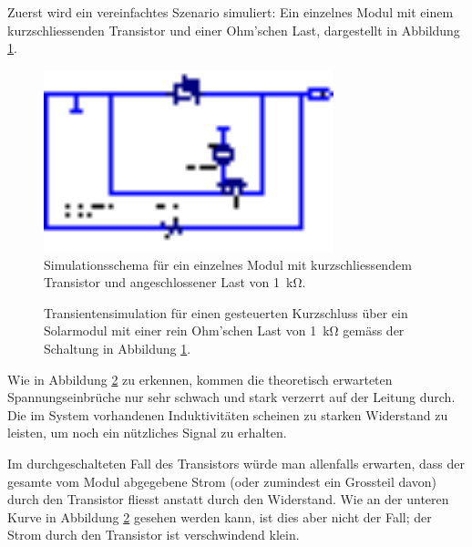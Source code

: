 Zuerst wird ein vereinfachtes Szenario simuliert: Ein einzelnes Modul mit einem
kurzschliessenden Transistor und einer Ohm'schen Last, dargestellt in Abbildung
\ref{fig:ltspice:shortCircuit:simple}.

\begin{figure}[h!tb]
    \centering
    \includegraphics[width=0.75\textwidth]{images/ltspice/jac/shortcircuit-single.eps}
    \caption{
        Simulationsschema  f\"ur  ein  einzelnes Modul  mit  kurzschliessendem
        Transistor und angeschlossener Last von \SI{1}{\kilo\ohm}.%
    }
    \label{fig:ltspice:shortCircuit:simple}
\end{figure}

\begin{figure}[h!tb]
    
    \caption{%
        Transientensimulation    f\"ur     einen    gesteuerten    Kurzschluss
        \"uber    ein   Solarmodul    mit    einer    rein   Ohm'schen    Last
        von   \SI{1}{\kilo\ohm}   gem\"ass    der   Schaltung   in   Abbildung
        \ref{fig:ltspice:shortCircuit:simple}.%
    }
    \label{fig:simu:shortCircuit:simple:tran}
\end{figure}

Wie in  Abbildung \ref{fig:simu:shortCircuit:simple:tran} zu  erkennen, kommen
die  theoretisch erwarteten  Spannungseinbr\"uche nur  sehr schwach  und stark
verzerrt  auf der  Leitung durch. Die  im System  vorhandenen Induktivit\"aten
scheinen zu starken Widerstand zu leisten,  um noch ein n\"utzliches Signal zu
erhalten.

Im  durchgeschalteten Fall  des Transistors  w\"urde man  allenfalls erwarten,
dass  der gesamte  vom Modul  abgegebene Strom  (oder zumindest  ein Grossteil
davon) durch den  Transistor fliesst anstatt durch den  Widerstand. Wie an der
unteren  Kurve  in Abbildung  \ref{fig:simu:shortCircuit:simple:tran}  gesehen
werden kann, ist dies aber nicht der  Fall; der Strom durch den Transistor ist
verschwindend klein.

